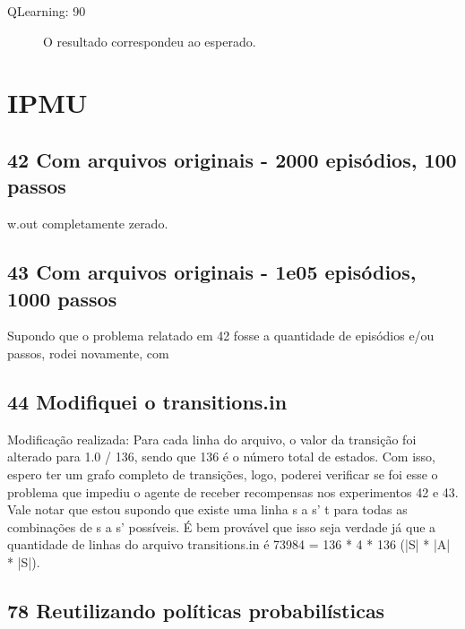 \documentclass[11pt]{article}
\begin{document}
\begin{description}
\begin{description}
\begin{description}
\begin{description}
\begin{description}
\end{description}
\begin{description}

\item[QLearning: 90]\label{sec-11.1.2.1.3.3.2.2}


O resultado correspondeu ao esperado.


\end{description}
\end{description}
\end{description}
\end{description}
\end{description}
\section{IPMU}
\label{sec-12}

\subsection{42 Com arquivos originais - 2000 episódios, 100 passos}
\label{sec-12.1}

w.out completamente zerado.


\subsection{43 Com arquivos originais - 1e05 episódios, 1000 passos}
\label{sec-12.2}

Supondo que o problema relatado em 42 fosse a quantidade de episódios
e/ou passos, rodei novamente, com 


\subsection{44 Modifiquei o transitions.in}
\label{sec-12.3}

   Modificação realizada:
   Para cada linha do arquivo, o valor da transição foi alterado para
   1.0 / 136, sendo que 136 é o número total de estados.
Com isso, espero ter um grafo completo de transições, logo, poderei
   verificar se foi esse o problema que impediu o agente de receber
   recompensas nos experimentos 42 e 43.
Vale notar que estou supondo que existe uma linha s a s' t para todas
   as combinações de s a s' possíveis.
É bem provável que isso seja verdade já que a quantidade de linhas do
   arquivo transitions.in é 73984 = 136 * 4 * 136 (|S| * |A| * |S|).


\subsection{78 Reutilizando políticas probabilísticas}
\label{sec-12.4}
\end{document}
